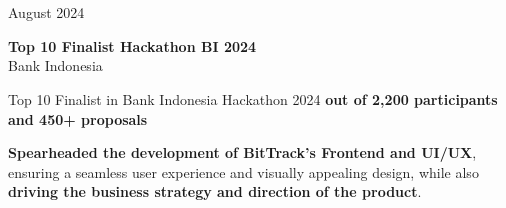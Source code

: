 \documentclass[../main.tex]{subfiles}
\begin{document}
\section{}

\begin{twocolentry}{
		August 2024}

	\textbf{Top 10 Finalist Hackathon BI 2024}\\
	Bank Indonesia

\end{twocolentry}
\vspace{0.10 cm}
\begin{onecolentry}
	\begin{highlights}
		\item Top 10 Finalist in Bank Indonesia Hackathon 2024 \textbf{out of 2,200 participants and 450+ proposals}
		\item \textbf{Spearheaded the development of BitTrack's Frontend and UI/UX}, ensuring a seamless user experience and visually appealing design, while also \textbf{driving the business strategy and direction of the product}.
	\end{highlights}
\end{onecolentry}
\end{document}
